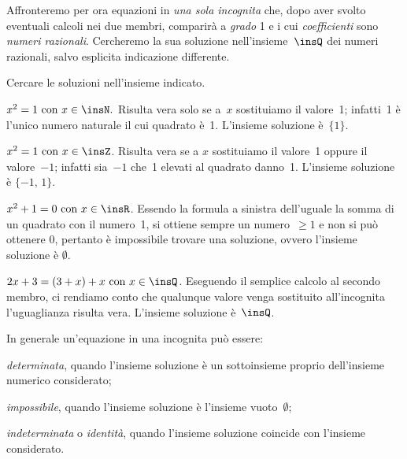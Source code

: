 Affronteremo per ora equazioni in
\emph{una sola incognita} che, dopo aver svolto eventuali calcoli nei due membri, comparirà a
\emph{grado} 1 e i cui \emph{coefficienti} sono \emph{numeri razionali}.
Cercheremo la sua soluzione
nell'insieme~$\insQ$ dei numeri razionali, salvo esplicita indicazione differente.
\begin{exrig}
 \begin{esempio}
Cercare le soluzioni nell'insieme indicato.
 \begin{enumeratea}
 \item $x^{2}=1 \text{ con }x\in\insN.$
Risulta vera solo se a~$x$ sostituiamo il valore~1; infatti~1 è
l'unico numero naturale il cui quadrato è~1.
L'insieme soluzione è~$\{1\}$.
 \item $x^{2}=1 \text{ con }x\in\insZ$.
Risulta vera se a
$x$ sostituiamo il valore~1 oppure il valore~$-1$; infatti sia~$-1$ che~1
elevati al quadrato danno~1. L'insieme soluzione è
$\{-1\text{,~}1\}$.
 \item $x^{2}+1=0\text{ con }x\in\insR$.
Essendo la formula a sinistra
dell'uguale la somma di un quadrato con il numero~1, si ottiene sempre
un numero~$\geq1$ e non si può ottenere $0$, pertanto è impossibile trovare una soluzione, ovvero l'insieme soluzione è $\emptyset$.
 \item $2x+3=(3+x)+x \text{ con } x\in\insQ$.
Eseguendo il semplice calcolo al secondo
membro, ci rendiamo conto che qualunque valore venga sostituito
all'incognita l'uguaglianza risulta
vera. L'insieme soluzione è~$\insQ$.
\end{enumeratea}
 \end{esempio}
\end{exrig}

In generale un'equazione in una incognita può essere:

\begin{enumeratea}
\item \emph{determinata}, quando l'insieme soluzione è un sottoinsieme proprio
dell'insieme numerico considerato;
\item \emph{impossibile}, quando l'insieme soluzione è l'insieme vuoto~$\emptyset$;
\item \emph{indeterminata} o \emph{identità}, quando l'insieme soluzione coincide con
l'insieme considerato.
\end{enumeratea}

